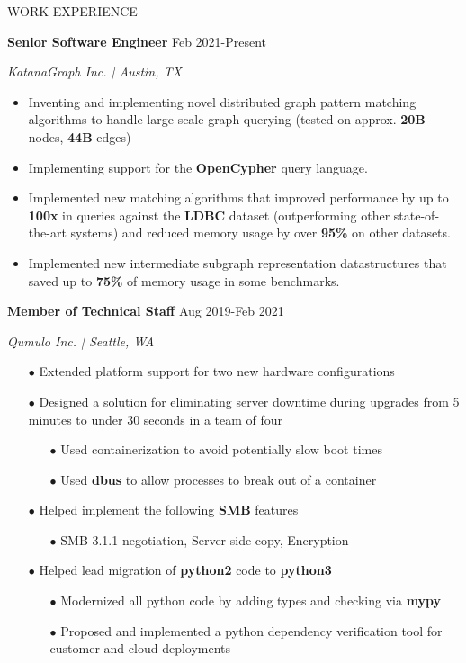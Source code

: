 \documentclass[paper=a4,fontsize=11pt]{scrartcl} %
\newcommand{\sepspace}{\vspace*{1em}}		%
\newcommand{\NewPart}[1]{ \noindent \large \usefont{OT1}{phv}{b}{n}\uppercase{#1} \normalfont \normalsize}
\newcommand{\EducationEntry}[4]{
		\noindent \textbf{#1}     %
			\hfill#2 \par  %
		\noindent \textit{#3} \par        %
		\noindent\hangafter=0 \small #4 %
		\normalsize \par}
\begin{document}
\begin{minipage}[t]{0.7\textwidth}
\sepspace

\NewPart{Work experience}{}

\EducationEntry{Senior Software Engineer}{Feb 2021-Present}{KatanaGraph Inc. | Austin, TX}{
\begin{itemize}
  \item Inventing and implementing novel distributed graph pattern matching algorithms to handle large scale graph querying (tested on approx. \textbf{20B} nodes, \textbf{44B} edges)
  \item Implementing support for the \textbf{OpenCypher} query language.
  \item Implemented new matching algorithms that improved performance by up to \textbf{100x} in queries against the \textbf{LDBC} dataset (outperforming other state-of-the-art systems) and reduced memory usage by over \textbf{95\%} on other datasets.
  \item Implemented new intermediate subgraph representation datastructures that saved up to \textbf{75\%} of memory usage in some benchmarks.
\end{itemize}
}

\EducationEntry{Member of Technical Staff}{Aug 2019-Feb 2021}{Qumulo Inc. | Seattle, WA}{
\begin{itemize}
  \item[$\bullet$] Extended platform support for two new hardware configurations
  \item[$\bullet$] Designed a solution for eliminating server downtime during upgrades from 5 minutes to under 30 seconds in a team of four
    \begin{itemize}
        \item[$\bullet$] Used containerization to avoid potentially slow boot times
        \item[$\bullet$] Used \textbf{dbus} to allow processes to break out of a container
    \end{itemize}
  \item[$\bullet$] Helped implement the following \textbf{SMB} features
    \begin{itemize}
      \item[$\bullet$] SMB 3.1.1 negotiation, Server-side copy, Encryption
    \end{itemize}
  \item[$\bullet$] Helped lead migration of \textbf{python2} code to \textbf{python3}
    \begin{itemize}
      \item[$\bullet$] Modernized all python code by adding types and checking via \textbf{mypy}
      \item[$\bullet$] Proposed and implemented a python dependency verification tool for customer and cloud deployments
    \end{itemize}
\end{itemize}
}


\end{minipage}
\end{document}
